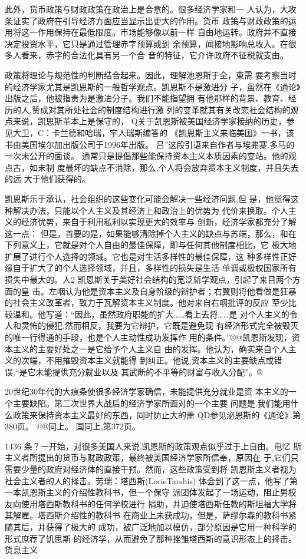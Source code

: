 此外，货币政策与财政政策在政治上是合意的。很多经济学家和一
人认为，大攻条证实了政府在引导经济方面应当显示出更大的作用。货币
政策与财政政策的运用将这一作用保持在最低限度。市场能够像以前一样
自由地运转。政府并不直接决定投资水平，它只是通过管理赤字预算或到
余预算，闻接地影响总收入。在很多人看来，赤字的合法化具有另一个合
音的特征，它介许政府不征税就支由。


政策将理论与规范性的判断结合起来。因此，理解池恩斯于全，束需
要考察当时的经济学家尤其是凯恩斯的一般哲学观点。凯恩斯不是激进分
子，虽然在《通论》出版之后，他被指责为是激进分子。我们不能指望拥
有他那样的背景、教育、经历的人,赞成对其所处社会的制度结构进行激
列的变革就其有关改恋社会结构的观点来说，凯思斯革本上是保守的，
Q关于凯恩斯被美国经济学家接纳的历史，参见大卫，C：卡兰德和哈瑞，宇人瑞斯编答的
《凯恩斯主义来临美国》一书，该书由美国埃尔加出版公司于1996年出版。
吕”这段引语来自作者与埃弗寨.多马的一次未公开的面谈。
通常只是提倡那些能保持资本主义本质因素的变站。他的观点古，如末制
度最坏的缺点不消除，那么,个人将会放弃资本主义制度，并且失去的远
大于他们获得的。

凯恩斯乐于承认，社会组织的这些变化可能会解决一些经济问题,但
是，他觉得这种解决办法，只能以个人主义及其经济上和政治上的优势为
代价来换取。个人主义的经济优势，来自于利用私利以实现更大的效率与
创新，经济学家都充分了解这一点：
但是，首要的是，如果能够清除掉个人主义的缺点与苏端，那么，和在
下列意义上，它就是对个人自由的最佳保障，即与任何其他制度相比，它
极大地扩展了进行个人选择的领域。它也是对生活多样性的最佳保障，这
种多样性正好缘自于扩大了的个人选择领域，并且，多样性的损失是生活
单调或极权国家所有损失中最大的。人2
凯恩斯关于美好社会结构的宽泛斩学观点，引起了来目两个方面的皇
击。左咽认为他是资本主义及自身阶级的辩护者；右翼则将他看做是狂暴
的社会主义改革者，致力于瓦解资本主义制度。他对来自右咽批评的反应
至少比较温和。他写道：“因此，虽然政府职能的扩大……看上去将……是
对个人主义的令人和灵怖的侵犯,然而相反，我要为它辩护，它既是避免现
有经济形式完全被毁灭的唯一行得通的手段，也是个人主动性成功发挥作
用的条件。”®@凯恩斯发现，资本主义的主要好处之一是它给予个人主义自
由的发挥。他认为，确实来自个人主义的次端，不用摧毁资本主义就能得
到纠正。他说,资本主义的主要缺点或错误,“是它未能提供充分就业以及
其武断的不平等的财富与收入分配”。®

20世纪30年代的大痕条使很多经济学家确信，未能提供充分就业是资
本主义的一个主要缺陷。第二次世界大战后的经济学家所面对的一个主要
问题是.我们能用什么政策来保持资本主义最好的东西，同时防止大的萧
QD参见泌恩斯的《通论》第380页。
@®同上。
国同上,第372页。

1436
条？一开始，对很多美国人来说,凯恩斯的政策观点似乎过于上自由。电忆
斯主义者所提出的货币与财政政策，最终被美国经济学家所信奉，原因在
于,它们只需要少量的政府对经济体的直接干预。然而，这些政策受到将
凯恩斯主义者视为社会主义者的人的择击。劳瑞：塔西斯(LorieTarshis)
体会到了这一点，他写了第一本凯恩斯主义的介绍性教科书，但一个保守
派团体发起了一场运动，阻止男校友向使用塔西斯教科书的任何学校进行
捐助，并迫使塔西斯任教的斯坦福大学将其解雇。塔西斯介绍性的教科书
在商业上未获成功，但是，萨缪尔森的教科书紧随其后，并获得了极大的
成功，被广泛地加以模仿，部分原因是它用一种科学的形式庶荐了饥思斯
的经济学，从而避免了那种挫雏塔西斯的意识形态上的择击。
货息主义

